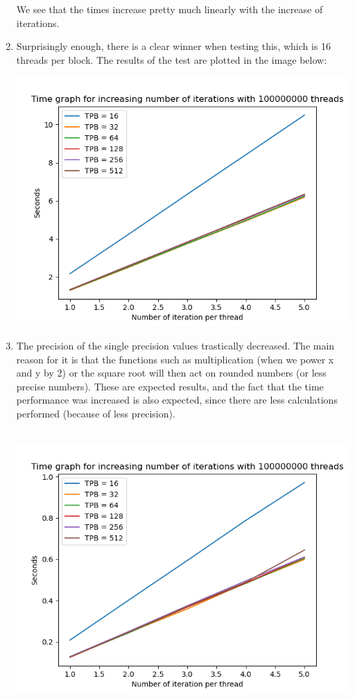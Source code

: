 \documentclass[english]{exam}
\begin{document}
\begin{enumerate}
  \noindent We see that the times increase pretty much linearly with the increase of iterations.
\item Surprisingly enough, there is a clear winner when testing this, which is 16 threads per block. The results of the test are plotted in the image below: \\
  \begin{center}
    \includegraphics[scale=0.65]{plot2.png}
  \end{center}
\item The precision of the single precision values trastically decreased. The main reason for it is that the functions such as multiplication (when we power x and y by 2) or the square root will then act on rounded numbers (or less precise numbers). These are expected results, and the fact that the time performance was increased is also expected, since there are less calculations performed (because of less precision).\\\\
  \begin{center}
    \includegraphics[scale=0.65]{plot4.png}

\end{center}
\end{enumerate}
\end{document}
